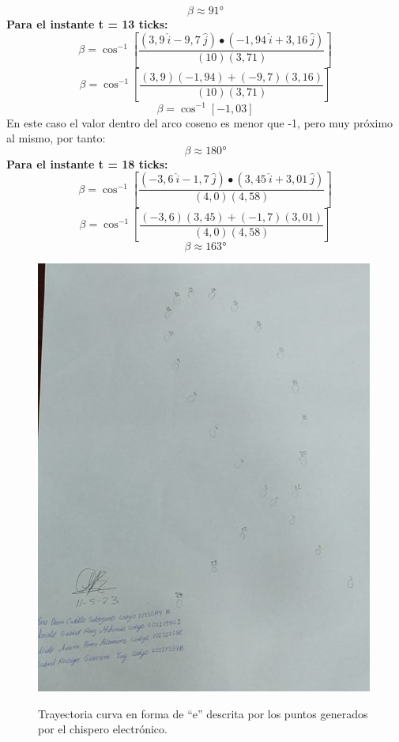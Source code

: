 \documentclass[../main.tex]{subfiles}
\begin{document}
\[\beta\approx91°\]
\textbf{Para el instante t = 13 ticks:}
\[\beta=\cos^{-1}{\left[\frac{\left(3,9\ \hat{i}-9,7\ \hat{j}\right)\bullet\left(-1,94\ \hat{i}+3,16\ \hat{j}\right)}{\left(10\right)\left(3,71\right)}\right]}\]
\[\beta=\cos^{-1}{\left[\frac{\left(3,9\right)\left(-1,94\right)+\left(-9,7\right)\left(3,16\right)}{\left(10\right)\left(3,71\right)}\right]}\]
\[\beta=\cos^{-1}{\left[-1,03\right]}\]
En este caso el valor dentro del arco coseno es menor que -1, pero muy próximo al mismo, por tanto:
\[\beta\approx180°\]
\textbf{Para el instante t = 18 ticks:}
\[\beta=\cos^{-1}{\left[\frac{\left(-3,6\ \hat{i}-1,7\ \hat{j}\right)\bullet\left(3,45\ \hat{i}+3,01\ \hat{j}\right)}{\left(4,0\right)\left(4,58\right)}\right]}\]
\[\beta=\cos^{-1}{\left[\frac{\left(-3,6\right)\left(3,45\right)+\left(-1,7\right)\left(3,01\right)}{\left(4,0\right)\left(4,58\right)}\right]}\]
\[\beta\approx163°\]


\begin{figure}[H]
    \centering
    \includegraphics[width=0.8\linewidth]{images/calc7.jpg}
    \label{ref:calc7}
    \caption{Trayectoria curva en forma de “e” descrita por los puntos generados por el chispero electrónico.}
\end{figure}
\end{document}
